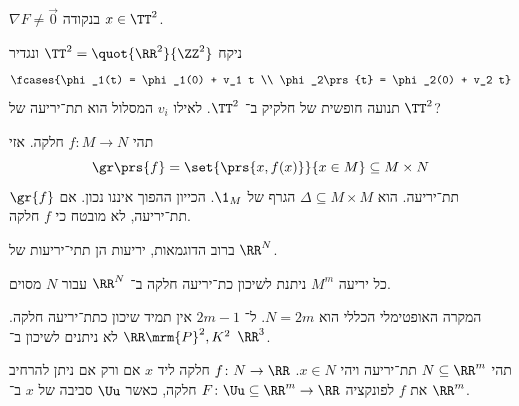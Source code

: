 \documentclass[a4paper,10pt,twoside,openany]{book}
\begin{document}
\begin{exercise}
$\nabla F \neq \vec{0}$
בנקודה
$x \in \TT^2$.
\end{exercise}
\begin{exercise}
ניקח $\TT^2 = \quot{\RR^2}{\ZZ^2}$
ונגדיר
\[\fcases{\phi_1(t) = \phi_1(0) + v_1 t \\
\phi_2\prs{t} = \phi_2(0) + v_2 t}\]
תנועה חופשית של חלקיק ב־%
$\TT^2$.
לאילו
$v_i$
המסלול הוא תת־יריעה של
$\TT^2$?
\end{exercise}
\begin{example}
תהי
$f \colon M \to N$
חלקה.
אזי
\[\gr\prs{f} = \set{\prs{x,f(x)}}{x \in M} \subseteq M \times N\]
תת־יריעה.
הוא
$\Delta \subseteq M \times M$
הגרף של
$\1_{M}$.
הכייון ההפוך איננו נכון. אם
$\gr{f}$
תת־יריעה, לא מובטח כי
$f$
חלקה.
\end{example}
\begin{remark}
ברוב הדוגמאות, יריעות הן תתי־יריעות של
$\RR^N$.
\end{remark}
\begin{theorem}
כל יריעה
$M^m$
ניתנת לשיכון כת־יריעה חלקה ב־%
$\RR^N$
עבור
$N$
מסוים.
\end{theorem}
\begin{remark}
המקרה האופטימלי הכללי הוא
$N=2m$.
ל־%
$2m-1$
אין תמיד שיכון כתת־יריעה חלקה.
$\RR\mrm{P}^2, K^2$
לא ניתנים לשיכון ב־%
$\RR^3$.
\end{remark}
\begin{exercise}
תהי $N \subseteq \RR^m$
תת־יריעה ויהי
$x \in N$.
$f \colon N \to \RR$
חלקה ליד
$x$
אם ורק אם ניתן להרחיב את
$f$
לפונקציה
$F \colon \Uu \subseteq \RR^m \to \RR$
חלקה, כאשר
$\Uu$
סביבה של
$x$
ב־%
$\RR^m$.
\end{exercise}
\end{document}
